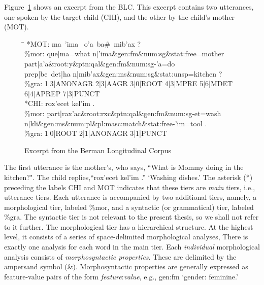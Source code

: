 Figure~\ref{fig:excerpt} shows an excerpt from the BLC. This excerpt contains
two utterances, one spoken by the target child (CHI), and the other
by the child's mother (MOT).
\begin{figure}[ht]
\vspace{10pt}
\label{fig:excerpt}
\caption{Excerpt from the Berman Longitudinal Corpus}
\vspace{-12pt}\begin{tabbing}
\small
\hspace{0.6in} \= \hspace{5.5in} \kill
\textsf{*MOT:} \> \textsf{ma\, \a'{i}ma \,
o\a'{a}\, ba\#\, mib\a'{a}x ?} \\
\textsf{\%mor:} \> \textsf{que|ma=what n|\a'{i}ma\&gen:fm\&num:sg\&stat:free=mother} \\
 \> \textsf{part|a\a'{a}\&root:y\&ptn:qal\&gen:fm\&num:sg-\a'{a}=do} \\
   \> \textsf{prep|be~det|ha n|mib\a'{a}x\&gen:ms\&num:sg\&stat:unsp=kitchen ?}\\
\textsf{\%gra:} \>	\textsf{1|3|ANONAGR 2|3|AAGR 3|0|ROOT 4|3|MPRE 5|6|MDET 6|4|APREP 7|3|PUNCT}\\
\textsf{*CHI:} \> \textsf{rox\a'{e}cet kel\a'{i}m .}\\
\textsf{\%mor:} \> \textsf{part|rax\a'{a}c\&root:rxc\&ptn:qal\&gen:fm\&num:sg-et=wash} \\
    \>  \textsf{n|kli}\&\textsf{gen:ms\&num:pl\&pl:masc:match\&stat:free-\a'{i}m=tool .} \\ 
\textsf{\%gra:} \> \textsf{1|0|ROOT 2|1|ANONAGR 3|1|PUNCT}
\end{tabbing}
\end{figure}
The first utterance is the mother's,
who says, ``What is Mommy doing in the kitchen?". The child
replies,``\textsf{rox\a'{e}cet kel\a'{i}m .}'' `Washing dishes.'
The asterisk (*) 
preceding the labels \textsf{CHI} and \textsf{MOT} indicates 
that these tiers are \emph{main} tiers, i.e.,  
utterance tiers. Each utterance is accompanied by two additional tiers, 
namely, a morphological tier, labeled \textsf{\%mor}, and a syntactic 
(or grammatical) tier, labeled \textsf{\%gra}. 
The syntactic tier is not relevant to the present thesis,
so we shall not refer to it further.
The morphological 
tier has a hierarchical structure. At the highest level, it consists of a 
series of space-delimited morphological analyses, 
There is exactly one analysis for each word in the main tier.  
Each \emph{individual} morphological analysis consists
of \textit{morphosyntactic properties}. These are delimited by the ampersand symbol (\textsf{\&}). 
Morphosyntactic properties are 
generally expressed as feature-value pairs of the 
form \textsf{\textit{feature}:\textit{value}}, e.g., \textsf{gen:fm} `gender: feminine.'

